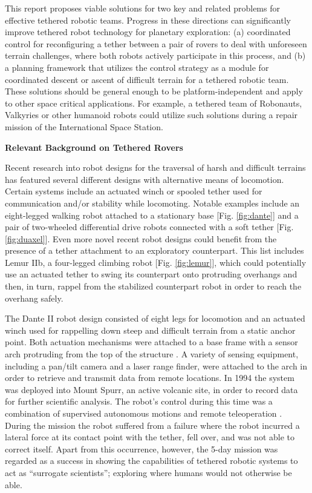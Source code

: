 \documentclass[12pt]{article}
\begin{document}
 This report proposes viable solutions for
two key and related problems for effective tethered robotic teams.
Progress in these directions can significantly improve tethered robot 
technology for
planetary exploration: (a) coordinated control for reconfiguring a
tether between a pair of rovers to deal with unforeseen terrain
challenges, where both robots actively participate in this process,
and (b) a planning framework that utilizes the control strategy as a
module for coordinated descent or ascent of difficult terrain for a
tethered robotic team.  These solutions should be general enough to
be platform-independent and apply to other space critical
applications. For example, a tethered team of Robonauts, Valkyries or
other humanoid robots could utilize such solutions during a repair
mission of the International Space Station.


{\bf\noindent Relevant Background on Tethered Rovers}

Recent research into robot designs for the traversal of harsh and
difficult terrains has featured several different designs with
alternative means of locomotion. Certain systems include an actuated
winch or spooled tether used for communication and/or stability while
locomoting.  Notable examples include an eight-legged walking robot
attached to a stationary base [Fig. \ref{fig:dante}] and a pair of
two-wheeled differential drive robots connected with a soft tether
[Fig. \ref{fig:duaxel}]. Even more novel recent robot designs could
benefit from the presence of a tether attachment to an exploratory
counterpart. This list includes Lemur IIb, a four-legged climbing
robot [Fig. \ref{fig:lemur}], which could potentially use an actuated
tether to swing its counterpart onto protruding overhangs and then, in
turn, rappel from the stabilized counterpart robot in order to reach
the overhang safely.


The Dante II robot design consisted of eight legs for locomotion and
an actuated winch used for rappelling down steep and difficult terrain
from a static anchor point.  Both actuation mechanisms were attached
to a base frame with a sensor arch protruding from the top of the
structure \cite{dante_design}. A variety of sensing equipment,
including a pan/tilt camera and a laser range finder, were attached to
the arch in order to retrieve and transmit data from remote
locations. In 1994 the system was deployed into Mount Spurr, an active
volcanic site, in order to record data for further scientific
analysis. The robot's control during this time was a combination of
supervised autonomous motions and remote teleoperation
\cite{dante_results}. During the mission the robot suffered from a
failure where the robot incurred a lateral force at its contact point
with the tether, fell over, and was not able to correct itself. Apart
from this occurrence, however, the 5-day mission was regarded as a
success in showing the capabilities of tethered robotic systems to act
as ``surrogate scientists''; exploring where humans would not
otherwise be able.
\end{document}
